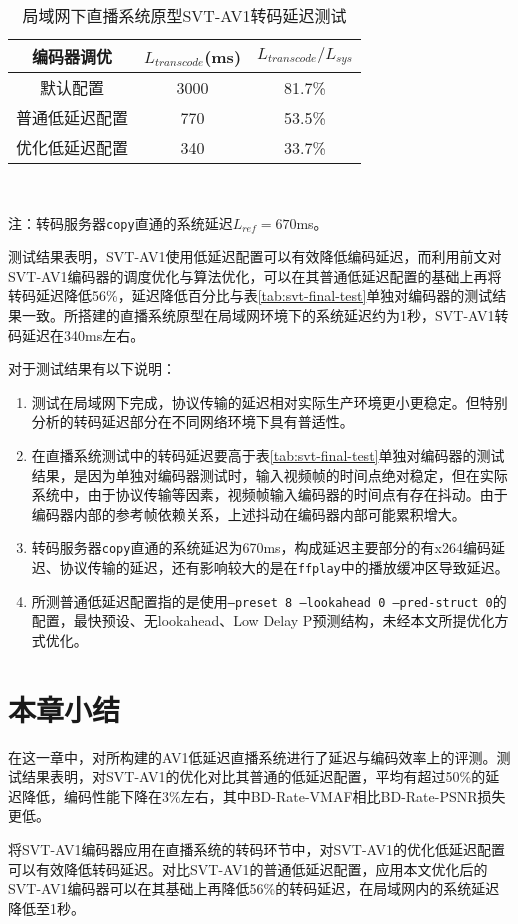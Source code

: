   \begin{table}[htbp]
		\caption{局域网下直播系统原型SVT-AV1转码延迟测试}
		\label{tab:sys-lat}
		\centering
		\begin{tabular}{ccc}
			\toprule
			 编码器调优  & $L_{transcode}$(ms) & $L_{transcode}/L_{sys}$ \\ \midrule
			 默认配置   &        3000         &         81.7\%          \\
			普通低延迟配置 &         770         &         53.5\%          \\
			优化低延迟配置 &         340         &         33.7\%          \\ \bottomrule
		\end{tabular}\\ \raggedright \vspace{8pt} \qquad \qquad \qquad \qquad
	\small 注：转码服务器\texttt{copy}直通的系统延迟$L_{ref}=670$ms。
	\end{table}

  测试结果表明，SVT-AV1使用低延迟配置可以有效降低编码延迟，而利用前文对SVT-AV1编码器的调度优化与算法优化，可以在其普通低延迟配置的基础上再将转码延迟降低56\%，延迟降低百分比与表\ref{tab:svt-final-test}单独对编码器的测试结果一致。所搭建的直播系统原型在局域网环境下的系统延迟约为1秒，SVT-AV1转码延迟在340ms左右。

  对于测试结果有以下说明：
  \begin{enumerate}[label=\arabic*)]
  	\item 测试在局域网下完成，协议传输的延迟相对实际生产环境更小更稳定。但特别分析的转码延迟部分在不同网络环境下具有普适性。
  	\item 在直播系统测试中的转码延迟要高于表\ref{tab:svt-final-test}单独对编码器的测试结果，是因为单独对编码器测试时，输入视频帧的时间点绝对稳定，但在实际系统中，由于协议传输等因素，视频帧输入编码器的时间点有存在抖动。由于编码器内部的参考帧依赖关系，上述抖动在编码器内部可能累积增大。
  	\item 转码服务器\texttt{copy}直通的系统延迟为670ms，构成延迟主要部分的有x264编码延迟、协议传输的延迟，还有影响较大的是在\texttt{ffplay}中的播放缓冲区导致延迟。
  	\item 所测普通低延迟配置指的是使用\texttt{--preset 8 --lookahead 0 --pred-struct 0}的配置，最快预设、无lookahead、Low Delay P预测结构，未经本文所提优化方式优化。
  \end{enumerate}

\section{本章小结}
在这一章中，对所构建的AV1低延迟直播系统进行了延迟与编码效率上的评测。测试结果表明，对SVT-AV1的优化对比其普通的低延迟配置，平均有超过50\%的延迟降低，编码性能下降在3\%左右，其中BD-Rate-VMAF相比BD-Rate-PSNR损失更低。

将SVT-AV1编码器应用在直播系统的转码环节中，对SVT-AV1的优化低延迟配置可以有效降低转码延迟。对比SVT-AV1的普通低延迟配置，应用本文优化后的SVT-AV1编码器可以在其基础上再降低56\%的转码延迟，在局域网内的系统延迟降低至1秒。